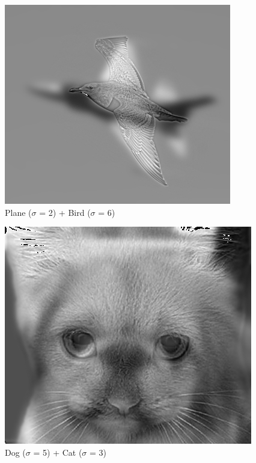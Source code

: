 \documentclass{article}
\begin{document}
\begin{minipage}{\linewidth}
    \centering
    \begin{minipage}{0.45\linewidth}
        \begin{figure}[H]
            \includegraphics[width=\linewidth]{Ejercicio3/hybrid3.png}          
			\caption{Plane ($\sigma$ = 2) + Bird ($\sigma$ = 6)}
        \end{figure}
    \end{minipage}
    \hspace{0.05\linewidth}
    \begin{minipage}{0.45\linewidth}
        \begin{figure}[H]
            \includegraphics[width=\linewidth]{Ejercicio3/hybrid4.png}          
			\caption{Dog ($\sigma$ = 5) + Cat ($\sigma$ = 3)}
        \end{figure}
    \end{minipage}   
    

\end{minipage}
\end{document}
